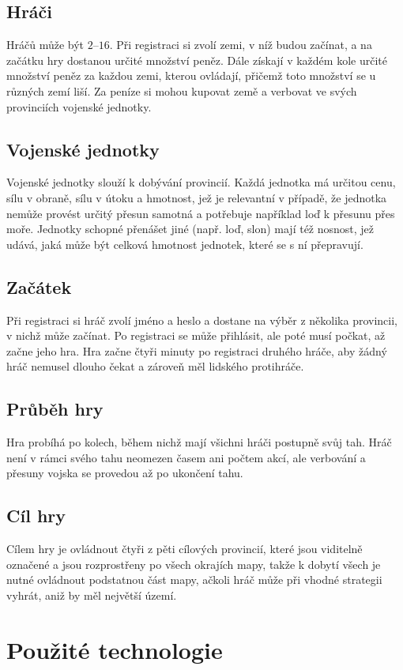 \documentclass[a4paper,12pt]{article}
\begin{document}
\subsection{Hráči}
Hráčů může být $2$--$16$. Při registraci si zvolí zemi, v níž budou začínat, a na začátku hry dostanou určité množství peněz. Dále získají v každém kole určité množství peněz za každou zemi, kterou ovládají, přičemž toto množství se u různých zemí liší. Za peníze si mohou kupovat země a verbovat ve svých provinciích vojenské jednotky.
\subsection{Vojenské jednotky}
Vojenské jednotky slouží k dobývání provincií. Každá jednotka má určitou cenu, sílu v obraně, sílu v útoku a hmotnost, jež je relevantní v případě, že jednotka nemůže provést určitý přesun samotná a potřebuje například loď k přesunu přes moře. Jednotky schopné přenášet jiné (např. loď, slon) mají též nosnost, jež udává, jaká může být celková hmotnost jednotek, které se s ní přepravují.
\subsection{Začátek}
Při registraci si hráč zvolí jméno a heslo a dostane na výběr z několika provincii, v nichž může začínat. Po registraci se může přihlásit, ale poté musí počkat, až začne jeho hra. Hra začne čtyři minuty po registraci druhého hráče, aby žádný hráč nemusel dlouho čekat a zároveň měl lidského protihráče.
\subsection{Průběh hry}
Hra probíhá po kolech, během nichž mají všichni hráči postupně svůj tah. Hráč není v rámci svého tahu neomezen časem ani počtem akcí, ale verbování a přesuny vojska se provedou až po ukončení tahu.
\subsection{Cíl hry}
Cílem hry je ovládnout čtyři z pěti cílových provincií, které jsou viditelně označené a jsou rozprostřeny po všech okrajích mapy, takže k dobytí všech je nutné ovládnout podstatnou část mapy, ačkoli hráč může při vhodné strategii vyhrát, aniž by měl největší území.

\section{Použité technologie}
\end{document}
